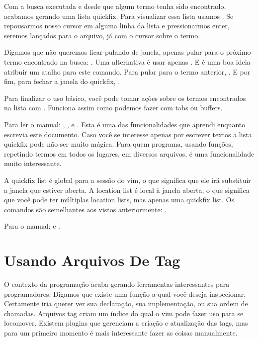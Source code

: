 
Com a busca executada e desde que algum termo tenha sido encontrado, acabamos gerando uma lista quickfix.
Para visualizar essa lista usamos .
Se repousarmos nosso cursor em alguma linha da lista e pressionarmos enter,
seremos lançados para o arquivo, já com o cursor sobre o termo.


Digamos que não queremos ficar pulando de janela, apenas pular para o próximo termo encontrado na busca: .
Uma alternativa é usar apenas . 
E é uma boa ideia atribuir um atalho para este comando.
Para pular para o termo anterior, .
E por fim, para fechar a janela do quickfix, .

Para finalizar o uso básico, você pode tomar ações sobre os termos encontrados na lista com .
Funciona assim como podemos fazer com tabs ou buffers.

Para ler o manual: , ,  e .
Esta é uma das funcionalidades que aprendi enquanto escrevia este documento.
Caso você se interesse apenas por escrever textos a lista quickfix pode não ser muito mágica.
Para quem programa, usando funções, repetindo termos em todos os lugares, em diversos arquivos,
é uma funcionalidade muito interessante.

A quickfix list é global para a sessão do vim, o que significa que ele irá substituir a janela que estiver aberta.
A location list é local à janela aberta, o que significa que você pode ter múltiplas location lists, mas apenas uma quickfix list.
Os comandos são semelhantes aos vistos anteriormente:    .

Para o manual:   e .

\section{Usando Arquivos De Tag}
O contexto da programação acaba gerando ferramentas interessantes para programadores.
Digamos que existe uma função a qual você deseja inspecionar.
Certamente iria querer ver sua declaração, sua implementação, ou sua ordem de chamadas.
Arquivos tag criam um índice do qual o vim pode fazer uso para se locomover.
Existem plugins que gerenciam a criação e atualização das tags,
mas para um primeiro momento é mais interessante fazer as coisas manualmente.

